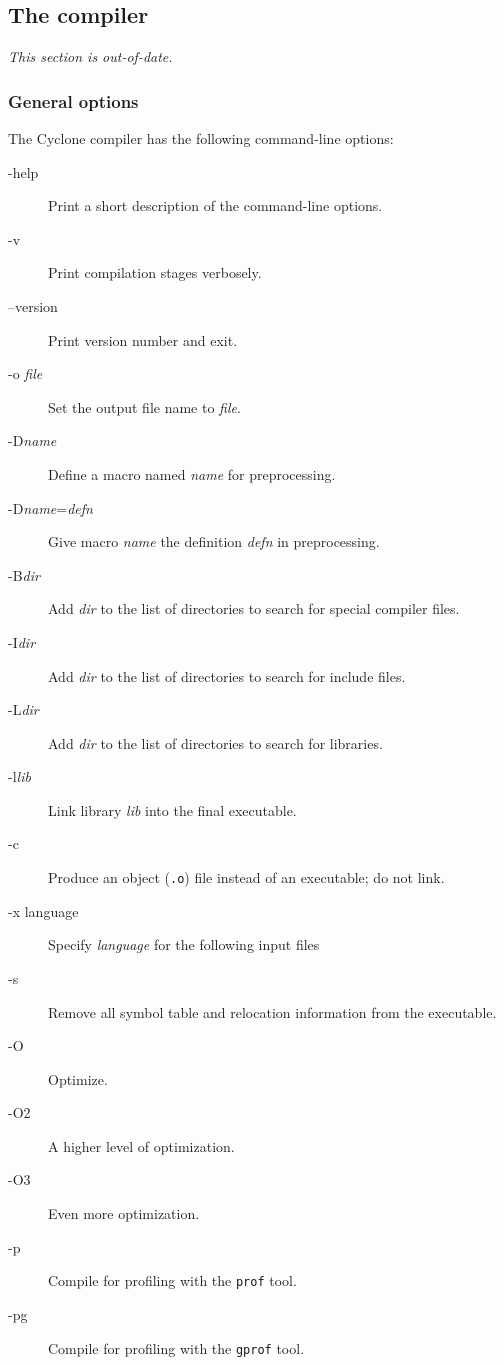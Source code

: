 \subsection{The compiler}

\emph{This section is out-of-date.}

\subsubsection*{General options}
The Cyclone compiler has the following command-line options:
\begin{description}
\item[-help] Print a short description of the command-line options.
\item[-v] Print compilation stages verbosely.
\item[--version] Print version number and exit.
\item[-o \textit{file}] Set the output file name to \textit{file}.
\item[-D\textit{name}]
  Define a macro named \textit{name} for preprocessing.
\item[-D\textit{name}=\textit{defn}]
  Give macro \textit{name} the definition \textit{defn} in preprocessing.
\item[-B\textit{dir}]
  Add \textit{dir} to the list of directories to search for special
  compiler files.
\item[-I\textit{dir}]
  Add \textit{dir} to the list of directories to search for include files.
\item[-L\textit{dir}]
  Add \textit{dir} to the list of directories to search for libraries.
\item[-l\textit{lib}]
  Link library \textit{lib} into the final executable.
\item[-c]
  Produce an object (\texttt{.o}) file instead of an executable; do
  not link.
\item[-x language]
  Specify \textit{language} for the following input files
\item[-s]
  Remove all symbol table and relocation information from the executable.
\item[-O]
  Optimize.
\item[-O2]
  A higher level of optimization.
\item[-O3]
  Even more optimization.
\item[-p]
  Compile for profiling with the \texttt{prof} tool.
\item[-pg]
  Compile for profiling with the \texttt{gprof} tool.

\end{description}

